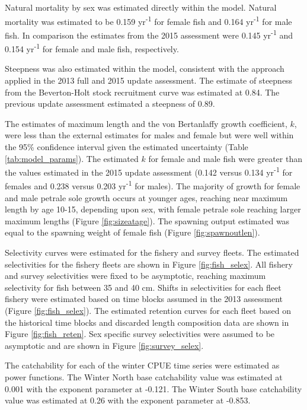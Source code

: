 \documentclass[12pt,]{article}
\begin{document}
Natural mortality by sex was estimated directly within the model.
Natural mortality was estimated to be 0.159 yr\textsuperscript{-1} for
female fish and 0.164 yr\textsuperscript{-1} for male fish. In
comparison the estimates from the 2015 assessment were 0.145
yr\textsuperscript{-1} and 0.154 yr\textsuperscript{-1} for female and
male fish, respectively.

Steepness was also estimated within the model, consistent with the
approach applied in the 2013 full and 2015 update assessment. The
estimate of steepness from the Beverton-Holt stock recruitment curve was
estimated at 0.84. The previous update assessment estimated a steepness
of 0.89.

The estimates of maximum length and the von Bertanlaffy growth
coefficient, \(k\), were less than the external estimates for males and
female but were well within the 95\% confidence interval given the
estimated uncertainty (Table \ref{tab:model_params}). The estimated
\(k\) for female and male fish were greater than the values estimated in
the 2015 update assessment (0.142 versus 0.134 yr\textsuperscript{-1}
for females and 0.238 versus 0.203 yr\textsuperscript{-1} for males).
The majority of growth for female and male petrale sole growth occurs at
younger ages, reaching near maximum length by age 10-15, depending upon
sex, with female petrale sole reaching larger maximum lengths (Figure
\ref{fig:sizeatage}). The spawning output estimated was equal to the
spawning weight of female fish (Figure \ref{fig:spawnoutlen}).

Selectivity curves were estimated for the fishery and survey fleets. The
estimated selectivities for the fishery fleets are shown in Figure
\ref{fig:fish_selex}. All fishery and survey selectivities were fixed to
be asymptotic, reaching maximum selectivity for fish between 35 and 40
cm. Shifts in selectivities for each fleet fishery were estimated based
on time blocks assumed in the 2013 assessment (Figure
\ref{fig:fish_selex}). The estimated retention curves for each fleet
based on the historical time blocks and discarded length composition
data are shown in Figure \ref{fig:fish_reten}. Sex specific survey
selectivities were assumed to be asymptotic and are shown in Figure
\ref{fig:survey_selex}.

The catchability for each of the winter CPUE time series were estimated
as power functions. The Winter North base catchability value was
estimated at 0.001 with the exponent parameter at -0.121. The Winter
South base catchability value was estimated at 0.26 with the exponent
parameter at -0.853.
\end{document}
